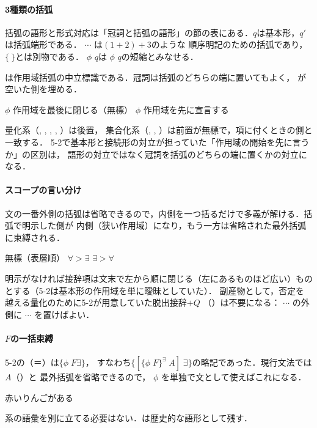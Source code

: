 \documentclass[../../main-detail.tex]{subfiles}
\begin{document}
\paragraph{3種類の括弧}
括弧の語形と形式対応は「冠詞と括弧の語形」の節の表にある．$q$は基本形，$q'$は括弧端形である． $\cdots$ は$(1+2)+3$のような
順序明記のための括弧であり，$\{\ \}$とは別物である． $\phi$ $q$は
 $\phi$  $q$の短縮とみなせる．

は作用域括弧の中立標識である．冠詞は括弧のどちらの端に置いてもよく，
が空いた側を埋める．
\begin{exe}
    \ex {} $\phi$ \hfill 作用域を最後に閉じる（無標）
    \ex {} $\phi$ \hfill 作用域を先に宣言する
\end{exe}
量化系（, , , , ）は後置，
集合化系（, , ）は前置が無標で，項に付くときの側と一致する．
5-2で基本形と接続形の対立が担っていた「作用域の開始を先に言うか」の区別は，
語形の対立ではなく冠詞を括弧のどちらの端に置くかの対立になる．

\paragraph{スコープの言い分け}
文の一番外側の括弧は省略できるので，内側を一つ括るだけで多義が解ける．括弧で明示した側が
内側（狭い作用域）になり，もう一方は省略された最外括弧に束縛される．
\begin{exe}
    \ex {}\hfill 無標（表層順）
    \ex {}\hfill $\forall > \exists$
    \ex {}\hfill $\exists > \forall$
\end{exe}
明示がなければ接辞項は文末で左から順に閉じる（左にあるものほど広い）ものとする（5-2は基本形の作用域を単に曖昧としていた）．
副産物として，否定を越える量化のために5-2が用意していた脱出接辞$+Q$
（）は不要になる： $\cdots$ の外側に $\cdots$ 
を置けばよい．

\paragraph{$F$の一括束縛}
5-2の（＝）は$\{\phi\; F\exists\}$，
すなわち$\{[\{\phi\; F\}^{\exists}\; A]\;\exists\}$の略記であった．現行文法では$A$（）と
最外括弧を省略できるので， $\phi$ を単独で文として使えばこれになる．
\begin{exe}
    \ex {}\hfill 赤いりんごがある
\end{exe}
系の語彙を別に立てる必要はない．は歴史的な語形として残す．
\end{document}
